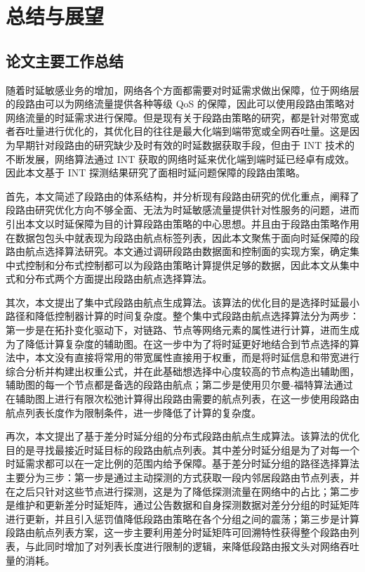 \chapter{总结与展望}

\section{论文主要工作总结}

随着时延敏感业务的增加，网络各个方面都需要对时延需求做出保障，位于网络层的段路由可以为网络流量提供各种等级 \gls*{QoS} 的保障，因此可以使用段路由策略对网络流量的时延需求进行保障。但是现有关于段路由策略的研究，都是针对带宽或者吞吐量进行优化的，其优化目的往往是最大化端到端带宽或全网吞吐量。这是因为早期针对段路由的研究缺少及时有效的时延数据获取手段，但由于 \gls*{INT} 技术的不断发展，网络算法通过 \gls*{INT} 获取的网络时延来优化端到端时延已经卓有成效。因此本文基于 \gls*{INT} 探测结果研究了面相时延问题保障的段路由策略。

首先，本文简述了段路由的体系结构，并分析现有段路由研究的优化重点，阐释了段路由研究优化方向不够全面、无法为时延敏感流量提供针对性服务的问题，进而引出本文以时延保障为目的计算段路由策略的中心思想。并且由于段路由策略作用在数据包包头中就表现为段路由航点标签列表，因此本文聚焦于面向时延保障的段路由航点选择算法研究。本文通过调研段路由数据面和控制面的实现方案，确定集中式控制和分布式控制都可以为段路由策略计算提供足够的数据，因此本文从集中式和分布式两个方面提出段路由航点选择算法。


其次，本文提出了集中式段路由航点生成算法。该算法的优化目的是选择时延最小路径和降低控制器计算的时间复杂度。整个集中式段路由航点选择算法分为两步：第一步是在拓扑变化驱动下，对链路、节点等网络元素的属性进行计算，进而生成为了降低计算复杂度的辅助图。在这一步中为了将时延更好地结合到节点选择的算法中，本文没有直接将常用的带宽属性直接用于权重，而是将时延信息和带宽进行综合分析并构建出权重公式，并在此基础想选择中心度较高的节点构造出辅助图，辅助图的每一个节点都是备选的段路由航点；第二步是使用贝尔曼-福特算法通过在辅助图上进行有限次松弛计算得出段路由需要的航点列表，在这一步使用段路由航点列表长度作为限制条件，进一步降低了计算的复杂度。

再次，本文提出了基于差分时延分组的分布式段路由航点生成算法。该算法的优化目的是寻找最接近时延目标的段路由航点列表。其中差分时延分组是为了对每一个时延需求都可以在一定比例的范围内给予保障。基于差分时延分组的路径选择算法主要分为三步：第一步是通过主动探测的方式获取一段内邻居段路由节点列表，并在之后只针对这些节点进行探测，这是为了降低探测流量在网络中的占比；第二步是维护和更新差分时延矩阵，通过公告数据和自身探测数据对差分分组的时延矩阵进行更新，并且引入惩罚值降低段路由策略在各个分组之间的震荡；第三步是计算段路由航点列表方案，这一步主要利用差分时延矩阵可回溯特性获得整个段路由列表，与此同时增加了对列表长度进行限制的逻辑，来降低段路由报文头对网络吞吐量的消耗。

